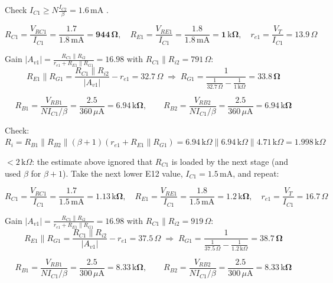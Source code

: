 \documentclass[11pt]{article}
\begin{document}
Check $I_{C1} \ge N\frac{I_{C2}}{\beta} = 1.6\,\mathrm{m}\mathrm{A}$ \checkmark. 

\[R_{C1} = \frac{V_{RC1}}{I_{C1}} = \frac{1.7}{1.8\,\mathrm{m}\mathrm{A}} = \mathbf{944\,\Omega},\quad R_{E1} = \frac{V_{RE1}}{I_{C1}} = \frac{1.8}{1.8\,\mathrm{m}\mathrm{A}} = \mathbf{1\,\mathrm{k}\Omega},\quad r_{e1} = \frac{V_T}{I_{C1}} = 13.9\,\Omega\]

Gain $|A_{v1}| = \frac{R_{C1}\|R_{i2}}{r_{e1} + R_{E1}\|R_{G1}} = 16.98$ with $R_{C1}\|R_{i2} = 791\,\Omega$:\[R_{E1}\|R_{G1} = \frac{R_{C1}\|R_{i2}}{|A_{v1}|} - r_{e1} = 32.7\,\Omega \;\Rightarrow\; R_{G1} = \frac{1}{\frac{1}{32.7\,\Omega} - \frac{1}{1\,\mathrm{k}\Omega}} = \mathbf{33.8\,\Omega}\]

\[R_{B1} = \frac{V_{RB1}}{N I_{C1}/\beta} = \frac{2.5}{360\,\mu \mathrm{A}} = \mathbf{6.94\,\mathrm{k}\Omega},\qquad R_{B2} = \frac{V_{RB2}}{N I_{C1}/\beta} = \frac{2.5}{360\,\mu \mathrm{A}} = \mathbf{6.94\,\mathrm{k}\Omega}\]

Check: $R_i = R_{B1}\|R_{B2}\|(\beta+1)(r_{e1} + R_{E1}\|R_{G1}) = 6.94\,\mathrm{k}\Omega\|6.94\,\mathrm{k}\Omega\|4.71\,\mathrm{k}\Omega = 1.998\,\mathrm{k}\Omega$ 

$< 2\,\mathrm{k}\Omega$: the estimate above ignored that $R_{C1}$ is loaded by the next stage (and used $\beta$ for $\beta+1$). Take the next lower E12 value, $I_{C1} = 1.5\,\mathrm{m}\mathrm{A}$, and repeat:

\[R_{C1} = \frac{V_{RC1}}{I_{C1}} = \frac{1.7}{1.5\,\mathrm{m}\mathrm{A}} = \mathbf{1.13\,\mathrm{k}\Omega},\quad R_{E1} = \frac{V_{RE1}}{I_{C1}} = \frac{1.8}{1.5\,\mathrm{m}\mathrm{A}} = \mathbf{1.2\,\mathrm{k}\Omega},\quad r_{e1} = \frac{V_T}{I_{C1}} = 16.7\,\Omega\]

Gain $|A_{v1}| = \frac{R_{C1}\|R_{i2}}{r_{e1} + R_{E1}\|R_{G1}} = 16.98$ with $R_{C1}\|R_{i2} = 919\,\Omega$:\[R_{E1}\|R_{G1} = \frac{R_{C1}\|R_{i2}}{|A_{v1}|} - r_{e1} = 37.5\,\Omega \;\Rightarrow\; R_{G1} = \frac{1}{\frac{1}{37.5\,\Omega} - \frac{1}{1.2\,\mathrm{k}\Omega}} = \mathbf{38.7\,\Omega}\]

\[R_{B1} = \frac{V_{RB1}}{N I_{C1}/\beta} = \frac{2.5}{300\,\mu \mathrm{A}} = \mathbf{8.33\,\mathrm{k}\Omega},\qquad R_{B2} = \frac{V_{RB2}}{N I_{C1}/\beta} = \frac{2.5}{300\,\mu \mathrm{A}} = \mathbf{8.33\,\mathrm{k}\Omega}\]
\end{document}
